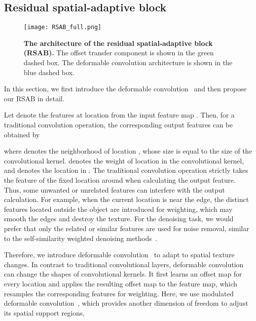 \documentclass[runningheads]{llncs}
\begin{document}
\subsection{Residual spatial-adaptive block}



\begin{figure}[t]
\begin{center}
\texttt{[image: RSAB\_full.png]}
\end{center}
\setlength{\abovecaptionskip}{0.cm}
   \caption{\textbf{The architecture of the residual spatial-adaptive block (RSAB).} The offset transfer component is shown in the green dashed box. The deformable convolution architecture is shown in the blue dashed box.}
\label{fig_RSAB}
\end{figure}

In this section, we first introduce the deformable convolution~\cite{dai2017deformable,zhu2019deformable} and then propose our RSAB in detail.

Let  denote the features at location  from the input feature map . Then, for a traditional convolution operation, the corresponding output features  can be obtained by

where  denotes the neighborhood of location , whose size is equal to the size of the convolutional kernel.  denotes the weight of location  in the convolutional kernel, and  denotes the location in . The traditional convolution operation strictly takes the feature of the fixed location around  when calculating the output feature. Thus, some unwanted or unrelated features can interfere with the output calculation. For example, when the current location is near the edge, the distinct features located outside the object are introduced for weighting, which may smooth the edges and destroy the texture. For the denoising task, we would prefer that only the related or similar features are used for noise removal, similar to the self-similarity weighted denoising methods~\cite{buades2005non,dabov2007color,dabov2007image}. 

Therefore, we introduce deformable convolution~\cite{dai2017deformable,zhu2019deformable} to adapt to spatial texture changes. In contrast to traditional convolutional layers, deformable convolution can change the shapes of convolutional kernels. It first learns an offset map for every location and applies the resulting offset map to the feature map, which resamples the corresponding features for weighting. Here, we use modulated deformable convolution~\cite{zhu2019deformable}, which provides another dimension of freedom to adjust its spatial support regions, 
\end{document}
